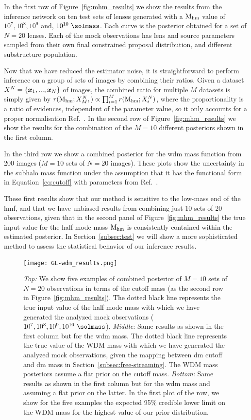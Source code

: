 In the first row of Figure~\ref{fig:mhm_results} we show the results from the inference network on ten test sets of lenses generated with a $\mathrm{M_{hm}}$ value of $10^7, 10^8, 10^9$ and, $10^{10} \ \si{\solmass}$. Each curve is the posterior obtained for a set of $N=20$ lenses. Each of the mock observations has lens and source parameters sampled from their own final constrained proposal distribution, and different substructure population.  

Now that we have reduced the estimator noise, it is straightforward to perform inference on a group of sets of images by combining their ratios. Given a dataset $X^N=\{\bm{x}_1, ..., \bm{x}_N\}$ of images, the combined ratio for multiple $M$ datasets is simply given by $r(\mathrm{M_{hm}};X^N_M,) \propto \prod_{i=1}^M r(\mathrm{M_{hm}}; X^N_i)$, where the proportionality is a ratio of evidences, independent of the parameter value, so it only accounts for a proper normalisation Ref.~\cite{Brehmer:2019jyt, Hermans:2019ioj}.
In the second row of Figure~\ref{fig:mhm_results} we show the results for the combination of the $M=10$ different posteriors shown in the first column.

In the third row we show a combined posterior for the \gls*{wdm} mass function from 200 images ($M=10$ sets of $N=20$ images). These plots show the uncertainty in the subhalo mass function under the assumption that it has the functional form in Equation~\eqref{eq:cutoff} with parameters from Ref.~\cite{Lovell:2020bcy}.

These first results show that our method is sensitive to the low-mass end of the \gls*{hmf}, and that we have unbiased results from combining just 10 sets of 20 observations, given that in the second panel of Figure~\ref{fig:mhm_results} the true input value for the half-mode mass $\mathrm{M_{hm}}$ is consistently contained within the estimated posterior. In Section~\ref{subsec:test} we will show a more sophisticated method to assess the statistical behavior of
our inference results.

\begin{figure}
	\centering
	\texttt{[image: GL-wdm\_results.png]}
	\caption{\textit{Top:} We show five examples of combined posterior of $M=10$ sets of $N=20$ observations in terms of the cutoff mass (as the second row in Figure~\ref{fig:mhm_results}). The dotted black line represents the true input value of the half mode mass with which we have generated the analyzed mock observations ($10^7, 10^8, 10^9,  10^{10} \ \si{\solmass}$). \textit{Middle:} Same results as shown in the first column but for the \gls*{wdm} mass. The dotted black line represents the true value of the WDM mass with which we have generated the analyzed mock observations, given the mapping between \gls*{dm} cutoff and \gls*{dm} mass in Section~\ref{subsec:free-streaming}. The WDM mass posteriors assume a flat prior on the cutoff mass. \textit{Bottom:} Same results as shown in the first column but for the \gls*{wdm} mass and assuming a flat prior on the latter. In the first plot of the row, we show for the five examples the expected 95\% credible lower limit on the WDM mass for the highest value of our prior distribution.}
\label{fig:wdm_results}
\end{figure}

